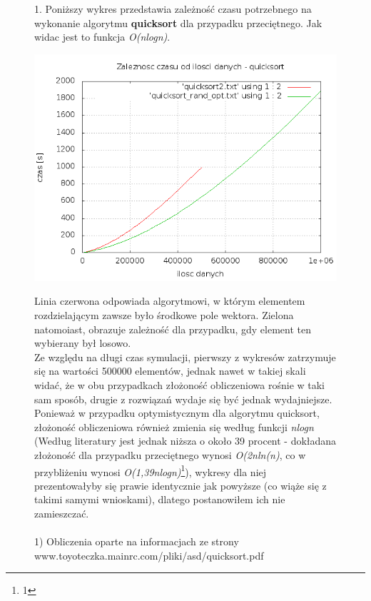 \documentclass[a4paper,11pt]{report}
\begin{document}
\begin{figure}
  1. Poniższy wykres przedstawia zależność czasu potrzebnego na wykonanie algorytmu \textbf{quicksort} dla przypadku przeciętnego. Jak widac jest to funkcja \emph{O(nlogn)}.
\begin{center} \includegraphics[scale=0.55]{./quicksort_opt.png}\end{center}
   Linia czerwona odpowiada algorytmowi, w którym elementem rozdzielającym zawsze było środkowe pole wektora. Zielona natomoiast, obrazuje zależność dla przypadku, gdy element ten wybierany był losowo.
  \\ Ze względu na długi czas symulacji, pierwszy z wykresów zatrzymuje się na wartości 500000 elementów, jednak nawet w takiej skali widać, że w obu przypadkach złożoność obliczeniowa rośnie w taki sam sposób, drugie z rozwiązań wydaje się być jednak wydajniejsze. Ponieważ w przypadku optymistycznym dla algorytmu quicksort, złożoność obliczeniowa również zmienia się według funkcji \emph{nlogn} (Według literatury jest jednak niższa o około 39 procent - dokładana złożoność dla przypadku przeciętnego wynosi \emph{O(2nln(n)}, co w przybliżeniu wynosi \emph{O(1,39nlogn)}\footnote{1}), wykresy dla niej prezentowałyby się prawie identycznie jak powyższe (co wiąże się z takimi samymi wnioskami), dlatego postanowiłem ich nie zamieszczać. 
  \\
  \\
  1) Obliczenia oparte na informacjach ze strony www.toyoteczka.mainrc.com/pliki/asd/quicksort.pdf
   \end{figure}
\end{document}
